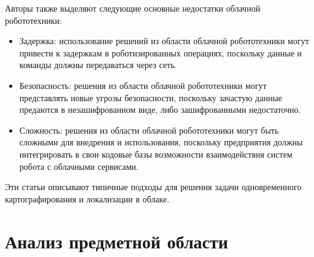\documentclass[a4paper, 14pt]{extreport}
\begin{document}
\par\noindent Авторы также выделяют следующие основные недостатки облачной робототехники: 
\begin{itemize}
        \item Задержка: использование решений из области облачной робототехники могут привести к задержкам в роботизированных операциях, поскольку данные и команды должны передаваться через сеть.
        \item Безопасность: решения из области облачной робототехники могут представлять новые угрозы безопасности, поскольку зачастую данные предаются в незашифрованном виде, либо зашифрованными недостаточно.
        \item Сложность: решения из области облачной робототехники могут быть сложными для внедрения и использования, поскольку предприятия должны интегрировать в свои кодовые базы возможности взаимодействия систем робота с облачными сервисами.
\end{itemize}
\par Эти статьи описывают типичные подходы для решения задачи одновременного картографирования и локализации в облаке.
\chapter{Анализ предметной области}
\end{document}
